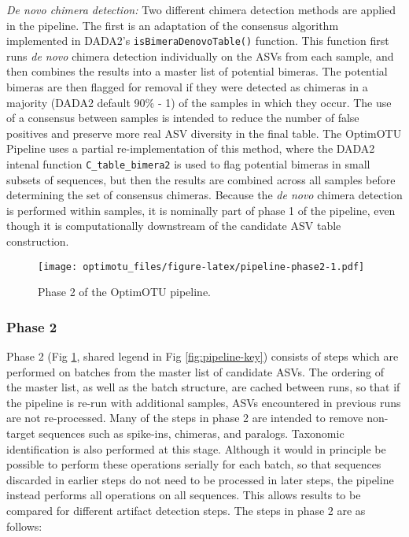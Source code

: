\documentclass[
]{article}
\begin{document}
\emph{De novo chimera detection:}
Two different chimera detection methods are applied in the pipeline.
The first is an adaptation of the consensus algorithm implemented in DADA2's \texttt{isBimeraDenovoTable()} function.
This function first runs \emph{de novo} chimera detection individually on the ASVs from each sample, and then combines the results into a master list of potential bimeras.
The potential bimeras are then flagged for removal if they were detected as chimeras in a majority (DADA2 default 90\% - 1) of the samples in which they occur.
The use of a consensus between samples is intended to reduce the number of false positives and preserve more real ASV diversity in the final table.
The OptimOTU Pipeline uses a partial re-implementation of this method, where the DADA2 intenal function \texttt{C\_table\_bimera2} is used to flag potential bimeras in small subsets of sequences, but then the results are combined across all samples before determining the set of consensus chimeras.
Because the \emph{de novo} chimera detection is performed within samples, it is nominally part of phase 1 of the pipeline, even though it is computationally downstream of the candidate ASV table construction.

\begin{figure}
\centering
\texttt{[image: optimotu\_files/figure-latex/pipeline-phase2-1.pdf]}
\caption{\label{fig:pipeline-phase2}Phase 2 of the OptimOTU pipeline.}
\end{figure}

\subsubsection{Phase 2}\label{phase-2}

Phase 2 (Fig \ref{fig:pipeline-phase2}, shared legend in Fig \ref{fig:pipeline-key}) consists of steps which are performed on batches from the master list of candidate ASVs.
The ordering of the master list, as well as the batch structure, are cached between runs, so that if the pipeline is re-run with additional samples, ASVs encountered in previous runs are not re-processed.
Many of the steps in phase 2 are intended to remove non-target sequences such as spike-ins, chimeras, and paralogs.
Taxonomic identification is also performed at this stage.
Although it would in principle be possible to perform these operations serially for each batch, so that sequences discarded in earlier steps do not need to be processed in later steps, the pipeline instead performs all operations on all sequences.
This allows results to be compared for different artifact detection steps.
The steps in phase 2 are as follows:
\end{document}
